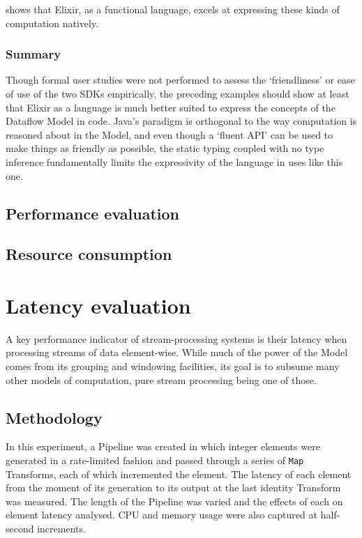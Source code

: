  shows that Elixir, as a functional language, excels at expressing these kinds of computation natively.

\subsubsection{Summary}

Though formal user studies were not performed to assess the `friendliness' or ease of use of the two SDKs empirically, the preceding examples should show at least that Elixir as a language is much better suited to express the concepts of the Dataflow Model in code.
Java's paradigm is orthogonal to the way computation is reasoned about in the Model, and even though a `fluent API' can be used to make things as friendly as possible, the static typing coupled with no type inference fundamentally limits the expressivity of the language in uses like this one.


\subsection{Performance evaluation}\label{sec:eval:performance}

\subsection{Resource consumption}\label{sec:eval:resource}

\section{Latency evaluation}\label{sec:eval:latency}

A key performance indicator of stream-processing systems is their latency when processing streams of data element-wise.
While much of the power of the Model comes from its grouping and windowing facilities, its goal is to subsume many other models of computation, pure stream processing being one of those.

\subsection{Methodology}

In this experiment, a Pipeline was created in which integer elements were generated in a rate-limited fashion and passed through a series of \verb|Map| Transforms, each of which incremented the element.
The latency of each element from the moment of its generation to its output at the last identity Transform was measured.
The length of the Pipeline was varied and the effects of each on element latency analysed.
CPU and memory usage were also captured at half-second increments.

